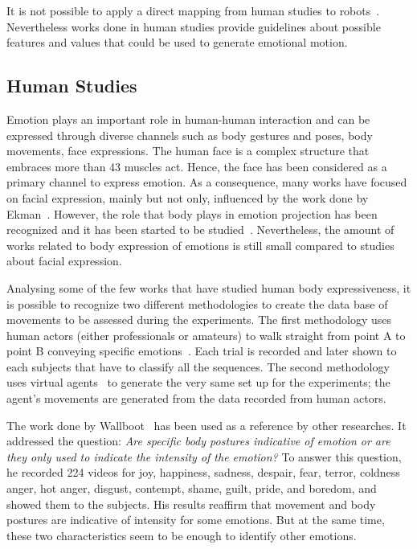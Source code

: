 
It is not possible to apply a direct mapping from human studies to robots~\cite{Saerbeck2007,Canamero2010}. Nevertheless works done in human studies provide guidelines about possible features and values that could be used to generate emotional motion. 

\subsection{Human Studies}

Emotion plays an important role in human-human interaction and can be expressed through diverse channels such as body gestures and poses, body movements, face expressions. The human face is a complex structure that embraces more than 43 muscles act. Hence, the face has been considered as a primary channel to express emotion. As a consequence, many works have focused on facial expression, mainly but not only, influenced by the work done by Ekman~\cite{Ekman2004}. However, the role that body plays in emotion projection has been recognized and it has been started to be studied~\cite{Gelder2008,Wallboot1998}. Nevertheless, the amount of works related to body expression of emotions is still small compared to studies about facial expression. 

Analysing some of the few works that have studied human body expressiveness, it is possible to recognize two different methodologies to create the data base of movements to be assessed during the experiments. The first methodology uses human actors (either professionals or amateurs) to walk straight from point A to point B conveying specific emotions~\cite{Dael2012,Meijer1989,Wallboot1998}. Each trial is recorded and later shown to each subjects that have to classify all the sequences. The second methodology uses virtual agents~\cite{Roether2009,Venture2014} to generate the very same set up for the experiments; the agent's movements are generated from the data recorded from human actors.

The work done by Wallboot~\cite{Wallboot1998} has been used as a reference by other researches. It addressed the question: \textit{Are specific body postures indicative of emotion or are they only used to indicate the intensity of the emotion?} To answer this question, he recorded 224 videos for joy, happiness, sadness, despair, fear, terror, coldness anger, hot anger, disgust, contempt, shame, guilt, pride, and boredom, and showed them to the subjects. His results reaffirm that movement and body postures are indicative of intensity for some emotions. But at the same time, these two characteristics seem to be enough to identify other emotions. 

